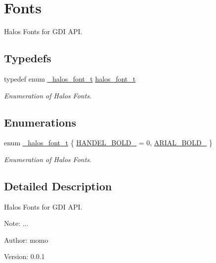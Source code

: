 \hypertarget{group__hgdi__fonts}{
\section{Fonts}
\label{group__hgdi__fonts}
}
Halos Fonts for GDI API.  


\subsection*{Typedefs}
\begin{CompactItemize}
\item 
\hypertarget{group__hgdi__fonts_gec86a33a52fa97333da1074389df46a3}{
typedef enum \hyperlink{group__hgdi__fonts_g00f868edeb5f757b072d265ae951ab3a}{\_\-halos\_\-font\_\-t} \hyperlink{group__hgdi__fonts_gec86a33a52fa97333da1074389df46a3}{halos\_\-font\_\-t}}
\label{group__hgdi__fonts_gec86a33a52fa97333da1074389df46a3}

\begin{CompactList}\small\item\em Enumeration of Halos Fonts. \item\end{CompactList}\end{CompactItemize}
\subsection*{Enumerations}
\begin{CompactItemize}
\item 
enum \hyperlink{group__hgdi__fonts_g00f868edeb5f757b072d265ae951ab3a}{\_\-halos\_\-font\_\-t} \{ \hyperlink{group__hgdi__fonts_gg00f868edeb5f757b072d265ae951ab3a885578c504898ecc5c89f1ebdd265f79}{HANDEL\_\-BOLD\_} =  0, 
\hyperlink{group__hgdi__fonts_gg00f868edeb5f757b072d265ae951ab3a06baaacffbceaa684aac2bad0bc97c1a}{ARIAL\_\-BOLD\_}
 \}
\begin{CompactList}\small\item\em Enumeration of Halos Fonts. \item\end{CompactList}\end{CompactItemize}


\subsection{Detailed Description}
Halos Fonts for GDI API. 

\begin{Desc}
\item[Note:]... \end{Desc}
\begin{Desc}
\item[Author:]momo \end{Desc}
\begin{Desc}
\item[Version:]0.0.1 \end{Desc}


